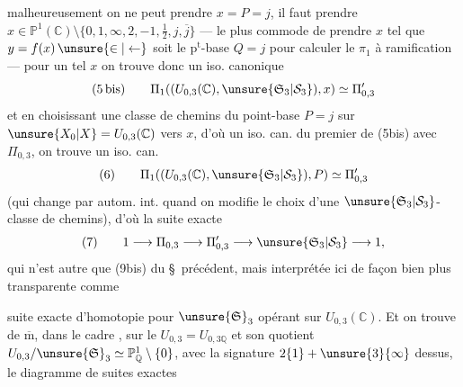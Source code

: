 
 malheureusement on ne peut prendre $x=P=j$, il faut prendre
$x\in\mathbb P^1(\mathbb C)\setminus\{0,1,\infty,2,-1,\tfrac12,j,\overline j\}$
--- le plus commode  de prendre $x$ tel que $y=f(x)\,\unsure{\in|\leftarrow}$ soit le $\mathrm p^{\mathrm t}$-base  $Q=j$ pour calculer le $\pi_1$ à ramification --- pour un tel $x$ on trouve donc un iso. canonique
\[
(5\,\mathrm{bis})\qquad
\Pi_1((U_{0,3}(\mathbb C),\unsure{\mathfrak S_3|\mathcal S_3}),x)\simeq\Pi'_{0,3}
\]
et en choisissant une classe de chemins du point-base  $P=j$ sur $\unsure{X_0|X}=U_{0,3}(\mathbb C)$ vers $x$, d'où un iso. can. du premier  de (5bis)  avec $\Pi_{0,3}$, on trouve un iso. can.
\[
(6)\qquad
\Pi_1((U_{0,3}(\mathbb C),\unsure{\mathfrak S_3|\mathcal S_3}),P)\simeq\Pi'_{0,3}
\]
(qui change par autom. int. quand on modifie le choix d'une $\unsure{\mathfrak S_3|\mathcal S_3}$-classe de chemins), d'où la suite exacte
\[
(7)\qquad
1\longrightarrow\Pi_{0,3}\longrightarrow\Pi'_{0,3}\longrightarrow\unsure{\mathfrak S_3|\mathcal S_3}\longrightarrow 1,
\]
qui n'est autre que (9bis) du \S\ précédent, mais interprétée ici de façon bien plus transparente comme

suite exacte d'homotopie pour $\unsure{\mathfrak{S}}_3$ opérant
sur $U_{0,3}(\mathbb{C})$. Et on trouve de $\overline{\mathrm m}$,
dans le cadre ,
 sur le  $U_{0,3}=U_{0,3\mathbb{Q}}$ et son
quotient $U_{0,3}/\unsure{\mathfrak{S}}_3\simeq\mathbb{P}^{1}_{\mathbb{Q}}\setminus\{0\}$, avec
la signature $2\{1\}+\unsure{3}\{\infty\}$ dessus, le
diagramme de suites exactes


